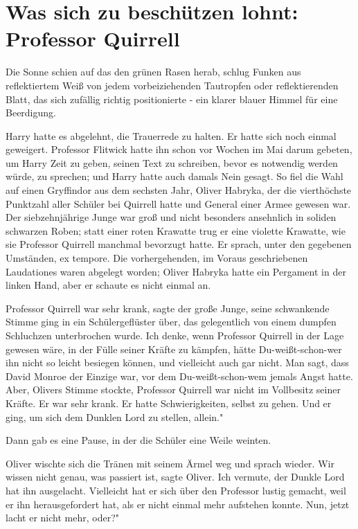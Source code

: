 \chapter{Was sich zu beschützen lohnt: Professor Quirrell}

Die Sonne schien auf das den grünen Rasen herab, schlug Funken aus reflektiertem
Weiß von jedem vorbeiziehenden Tautropfen oder reflektierenden Blatt, das sich
zufällig richtig positionierte - ein klarer blauer Himmel für eine Beerdigung.

Harry hatte es abgelehnt, die Trauerrede zu halten. Er hatte sich noch einmal
geweigert. Professor Flitwick hatte ihn schon vor Wochen im Mai darum gebeten,
um Harry Zeit zu geben, seinen Text zu schreiben, bevor es notwendig werden
würde, zu sprechen; und Harry hatte auch damals Nein gesagt. So fiel die Wahl
auf einen Gryffindor aus dem sechsten Jahr, Oliver Habryka, der die vierthöchste
Punktzahl aller Schüler bei Quirrell hatte und General einer Armee gewesen war.
Der siebzehnjährige Junge war groß und nicht besonders ansehnlich in soliden
schwarzen Roben; statt einer roten Krawatte trug er eine violette Krawatte, wie
sie Professor Quirrell manchmal bevorzugt hatte. Er sprach, unter den gegebenen
Umständen, ex tempore. Die vorhergehenden, im Voraus geschriebenen Laudationes
waren abgelegt worden; Oliver Habryka hatte ein Pergament in der linken Hand,
aber er schaute es nicht einmal an.

\glqq Professor Quirrell war sehr krank\grqq{}, sagte der große Junge, seine
schwankende Stimme ging in ein Schülergeflüster über, das gelegentlich von einem
dumpfen Schluchzen unterbrochen wurde. \glqq Ich denke, wenn Professor Quirrell
in der Lage gewesen wäre, in der Fülle seiner Kräfte zu kämpfen, hätte
Du-weißt-schon-wer ihn nicht so leicht besiegen können, und vielleicht auch gar
nicht. Man sagt, dass David Monroe der Einzige war, vor dem Du-weißt-schon-wem
jemals Angst hatte. Aber\grqq{}, Olivers Stimme stockte, \glqq Professor
Quirrell war nicht im Vollbesitz seiner Kräfte. Er war sehr krank. Er hatte
Schwierigkeiten, selbst zu gehen. Und er ging, um sich dem Dunklen Lord zu
stellen, allein."

Dann gab es eine Pause, in der die Schüler eine Weile weinten.

Oliver wischte sich die Tränen mit seinem Ärmel weg und sprach wieder. \glqq Wir
wissen nicht genau, was passiert ist\grqq{}, sagte Oliver. \glqq Ich vermute,
der Dunkle Lord hat ihn ausgelacht. Vielleicht hat er sich über den Professor
lustig gemacht, weil er ihn herausgefordert hat, als er nicht einmal mehr
aufstehen konnte. Nun, jetzt lacht er nicht mehr, oder?"

